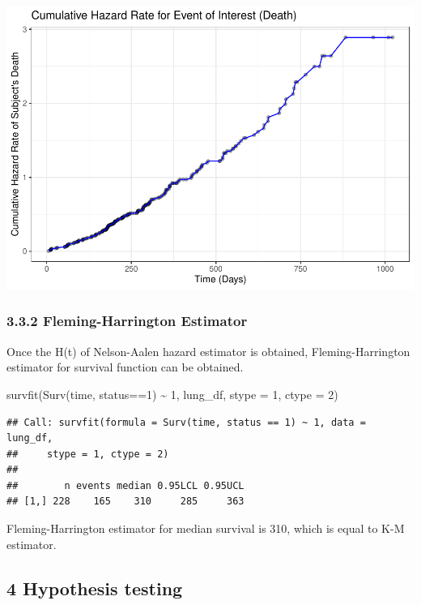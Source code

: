 \documentclass[
]{article}
\newenvironment{Shaded}{\begin{snugshade}}{\end{snugshade}}
\newcommand{\AttributeTok}[1]{\textcolor[rgb]{0.77,0.63,0.00}{#1}}
\newcommand{\DecValTok}[1]{\textcolor[rgb]{0.00,0.00,0.81}{#1}}
\newcommand{\FunctionTok}[1]{\textcolor[rgb]{0.00,0.00,0.00}{#1}}
\newcommand{\NormalTok}[1]{#1}
\newcommand{\SpecialCharTok}[1]{\textcolor[rgb]{0.00,0.00,0.00}{#1}}
\begin{document}
\includegraphics{final_project_files/figure-latex/unnamed-chunk-12-1.pdf}

\hypertarget{fleming-harrington-estimator}{%
\subsubsection{3.3.2 Fleming-Harrington
Estimator}\label{fleming-harrington-estimator}}

Once the H(t) of Nelson-Aalen hazard estimator is obtained,
Fleming-Harrington estimator for survival function can be obtained.

\begin{Shaded}
\begin{Highlighting}[]
\FunctionTok{survfit}\NormalTok{(}\FunctionTok{Surv}\NormalTok{(time, status}\SpecialCharTok{==}\DecValTok{1}\NormalTok{) }\SpecialCharTok{\textasciitilde{}} \DecValTok{1}\NormalTok{, lung\_df, }\AttributeTok{stype =} \DecValTok{1}\NormalTok{, }\AttributeTok{ctype =} \DecValTok{2}\NormalTok{)}
\end{Highlighting}
\end{Shaded}

\begin{verbatim}
## Call: survfit(formula = Surv(time, status == 1) ~ 1, data = lung_df, 
##     stype = 1, ctype = 2)
## 
##        n events median 0.95LCL 0.95UCL
## [1,] 228    165    310     285     363
\end{verbatim}

Fleming-Harrington estimator for median survival is 310, which is equal
to K-M estimator.

\hypertarget{hypothesis-testing}{%
\subsection{4 Hypothesis testing}\label{hypothesis-testing}}
\end{document}
